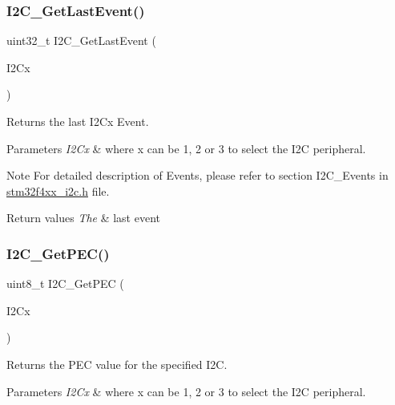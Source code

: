 \subsubsection{\texorpdfstring{I2\+C\+\_\+\+Get\+Last\+Event()}{I2C\_GetLastEvent()}}
{\footnotesize\ttfamily uint32\+\_\+t I2\+C\+\_\+\+Get\+Last\+Event (\begin{DoxyParamCaption}\item[{I2\+C\+\_\+\+Type\+Def $\ast$}]{I2\+Cx }\end{DoxyParamCaption})}



Returns the last I2\+Cx Event. 


\begin{DoxyParams}{Parameters}
{\em I2\+Cx} & where x can be 1, 2 or 3 to select the I2C peripheral.\\
\hline
\end{DoxyParams}
\begin{DoxyNote}{Note}
For detailed description of Events, please refer to section I2\+C\+\_\+\+Events in \mbox{\hyperlink{stm32f4xx__i2c_8h}{stm32f4xx\+\_\+i2c.\+h}} file.
\end{DoxyNote}

\begin{DoxyRetVals}{Return values}
{\em The} & last event \\
\hline
\end{DoxyRetVals}
\mbox{\label{group___i2_c_ga7bf75e7c27c0e1d73e70fc0e1c7cd1dd}} 
\subsubsection{\texorpdfstring{I2\+C\+\_\+\+Get\+P\+E\+C()}{I2C\_GetPEC()}}
{\footnotesize\ttfamily uint8\+\_\+t I2\+C\+\_\+\+Get\+P\+EC (\begin{DoxyParamCaption}\item[{I2\+C\+\_\+\+Type\+Def $\ast$}]{I2\+Cx }\end{DoxyParamCaption})}



Returns the P\+EC value for the specified I2C. 


\begin{DoxyParams}{Parameters}
{\em I2\+Cx} & where x can be 1, 2 or 3 to select the I2C peripheral. \\
\hline
\end{DoxyParams}

